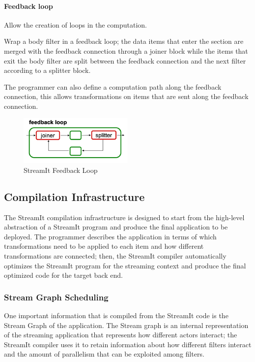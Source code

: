 \documentclass[../main.tex]{subfiles}
\begin{document}
\paragraph{Feedback loop}
Allow the creation of loops in the computation.

Wrap a body filter in a feedback loop; the data items that enter the section are merged with the feedback connection through a joiner block while the items that exit the body filter are split between the feedback connection and the next filter according to a splitter block. 

The programmer can also define a computation path along the feedback connection, this allows transformations on items that are sent along the feedback connection.

\begin{figure}[h!]
  \includegraphics[width=0.5\textwidth]{images/StreamItFeedbackLoop.png}
  \centering
  \caption{StreamIt Feedback Loop}
  \label{fig:feedback}
\end{figure}

\subsection{Compilation Infrastructure}
The StreamIt compilation infrastructure \cite{streamit4} is designed to start from the high-level abstraction of a StreamIt program and produce the final application to be deployed. 
The programmer describes the application in terms of which transformations need to be applied to each item and how different transformations are connected; then, the StreamIt compiler automatically optimizes the StreamIt program for the streaming context and produce the final optimized code for the target back end.

\subsubsection{Stream Graph Scheduling}
One important information that is compiled from the StreamIt code is the Stream Graph of the application. The Stream graph is an internal representation of the streaming application that represents how different actors interact; the StreamIt compiler uses it to retain information about how different filters interact and the amount of parallelism that can be exploited among filters.
\end{document}
